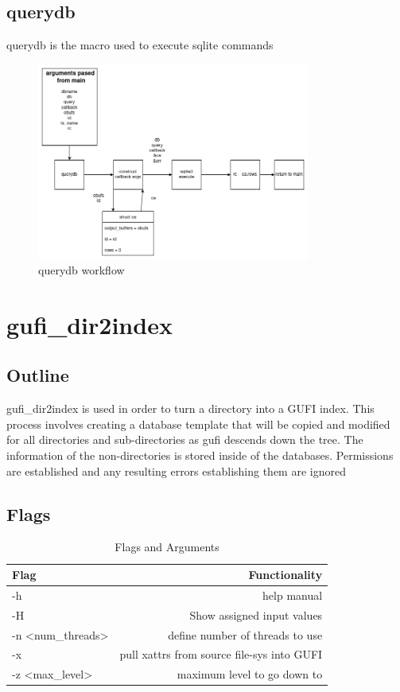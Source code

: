 \documentclass{article}
\begin{document}
\clearpage

\subsection{querydb}
querydb is the macro used to execute sqlite commands


\begin{figure} [h]
\centering
\includegraphics[width=0.8\textwidth]{querydb.png}
\caption{\label{fig:querydb}querydb workflow}
\end{figure}


\clearpage

\section{gufi\_dir2index}

\subsection{Outline}
gufi\_dir2index is used in order to turn a directory into a GUFI index. This process involves creating a database template that will be copied and modified for all directories and sub-directories as gufi descends down the tree. The information of the non-directories is stored inside of the databases. Permissions are established and any resulting errors establishing them are ignored

\subsection{Flags}

\begin{table} [h]
\centering
\begin{tabular}{l|r}
Flag & Functionality \\\hline
-h & help manual \\
-H & Show assigned input values \\
-n \textless num\_threads\textgreater  & define number of threads to use \\
-x & pull xattrs from source file-sys into GUFI \\
-z \textless max\_level\textgreater & maximum level to go down to
\end{tabular}
\caption{\label{tab:widgets}Flags and Arguments}
\end{table}
\end{document}
